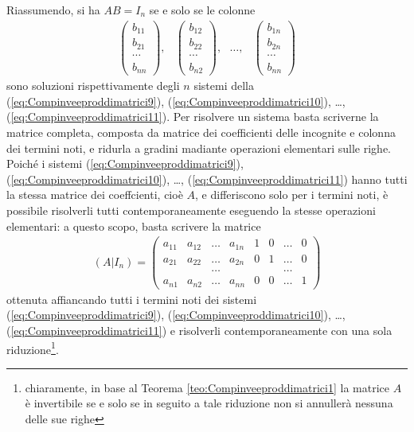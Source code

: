 Riassumendo, si ha $AB=I_n$ se e solo se le colonne
\begin{eqnarray*}
  \begin{pmatrix}
    b_{11}\\
    b_{21}\\
    \cdots\\
    b_{nn}
  \end{pmatrix}, &
                   \begin{pmatrix}
                     b_{12}\\
                     b_{22}\\
                     \cdots\\
                     b_{n2}
                   \end{pmatrix}, \text{ } \dots, &
                                            \begin{pmatrix}
                                              b_{1n}\\
                                              b_{2n}\\
                                              \cdots\\

                                              b_{nn}
                                            \end{pmatrix}
\end{eqnarray*}
sono soluzioni rispettivamente degli $n$ sistemi della
(\ref{eq:Compinveeproddimatrici9}),
(\ref{eq:Compinveeproddimatrici10}),
\dots, (\ref{eq:Compinveeproddimatrici11}). Per risolvere un sistema
basta scriverne la matrice completa, composta da matrice dei
coefficienti delle incognite e colonna dei termini noti, e ridurla
a gradini madiante operazioni elementari sulle righe. Poiché i
sistemi (\ref{eq:Compinveeproddimatrici9}),
(\ref{eq:Compinveeproddimatrici10}),
\dots, (\ref{eq:Compinveeproddimatrici11}) hanno tutti la stessa
matrice dei coeffcienti, cioè $A$, e differiscono solo per i
termini noti, è possibile risolverli tutti contemporaneamente
eseguendo la stesse operazioni elementari: a questo scopo, basta
scrivere la matrice
\begin{eqnarray}
  \label{eq:Compinveeproddimatrici12}
  (A| I_n)=\left(
  \begin{array}{cccc|cccc}
    a_{11}& a_{12}& \dots& a_{1n}& 1& 0& \dots&0 \\
    a_{21} & a_{22} & \dots &a_{2n} & 0 & 1 &\dots &0\\
          &&\dots&&&&\dots\\
    a_{n1}& a_{n2} & \dots&a_{nn} & 0 & 0 & \dots & 1
  \end{array}
  \right)
\end{eqnarray}
ottenuta affiancando tutti i termini noti dei sistemi
(\ref{eq:Compinveeproddimatrici9}),
(\ref{eq:Compinveeproddimatrici10}),
\dots, (\ref{eq:Compinveeproddimatrici11}) e risolverli
contemporaneamente con una sola riduzione\footnote{chiaramente,
  in base al Teorema \ref{teo:Compinveeproddimatrici1} la matrice
  $A$ è invertibile se e solo se in seguito a tale riduzione non si
  annullerà nessuna delle sue righe}.

